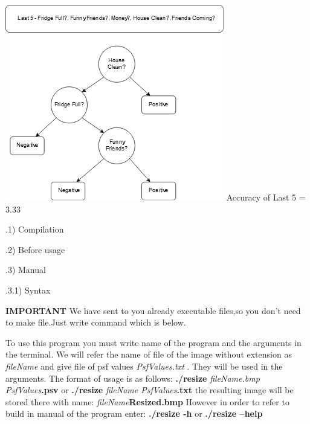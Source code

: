 \documentclass{article}
\begin{document}
\begin{center}
    \includegraphics[scale=1]{Last.png}
    \newline \newline Accuracy of Last 5 = 3.33%
\end{center}

.1) Compilation


.2) Before usage


.3) Manual

.3.1) Syntax

\textbf{IMPORTANT } We have sent to you  already executable files,so you don't need to make file.Just write command which is below.



To use this program you must write name of the program and the arguments in the terminal. We will refer  the name of file of the image without extension as \textit{fileName} and give file of psf values \textit{PsfValues.txt} . They will be used in the arguments. The format of usage is as follows:\newline
\indent\textbf{./resize }\textit{fileName.bmp PsfValues}\textbf{.psv}\newline
or\newline
\indent\textbf{./resize }\textit{fileName PsfValues}\textbf{.txt}\newline
 the resulting image will be stored there with name:\newline
\indent\textit{fileName}\textbf{Resized}\textit{}\textbf{.bmp}\newline
However in order to refer to build in manual of the program enter:\newline
\indent\textbf{./resize -h}\newline
or\newline
\indent\textbf{./resize  --help}
\end{document}
